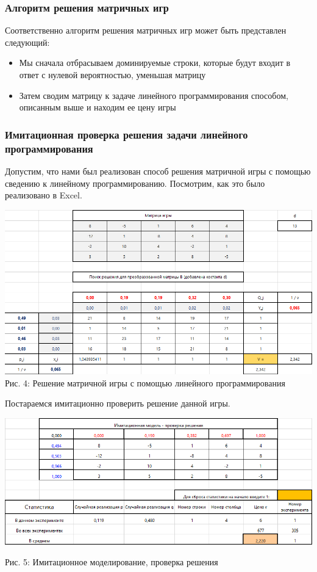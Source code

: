 \documentclass[aps,%
12pt,%
final,%
oneside,
onecolumn,%
musixtex, %
superscriptaddress,%
centertags]{article} %
\theoremstyle{plain}
\theoremstyle{definition}
\theoremstyle{remark}
\begin{document}
\subsubsection{Алгоритм решения матричных игр}

Соответственно алгоритм решения матричных игр может быть представлен следующий:

\begin{itemize}
  \item Мы сначала отбрасываем доминируемые строки, которые будут входит в ответ с нулевой вероятностью, уменьшая матрицу
  \item Затем сводим матрицу к задаче линейного программирования способом, описанным выше и находим ее цену игры
\end{itemize}

\subsubsection{Имитационная проверка решения задачи линейного программирования}

Допустим, что нами был реализован способ решения матричной игры с помощью сведению к линейному программированию. Посмотрим, как это было реализовано в Excel.

\begin{center}
  \includegraphics[scale=0.37]{images/4.png}
  Рис. 4: Решение матричной игры с помощью линейного программирования
\end{center}

Постараемся имитационно проверить решение данной игры.

\begin{center}
  \includegraphics[scale=0.37]{images/5.png}

  Рис. 5: Имитационное моделирование, проверка решения
\end{center}
\end{document}
